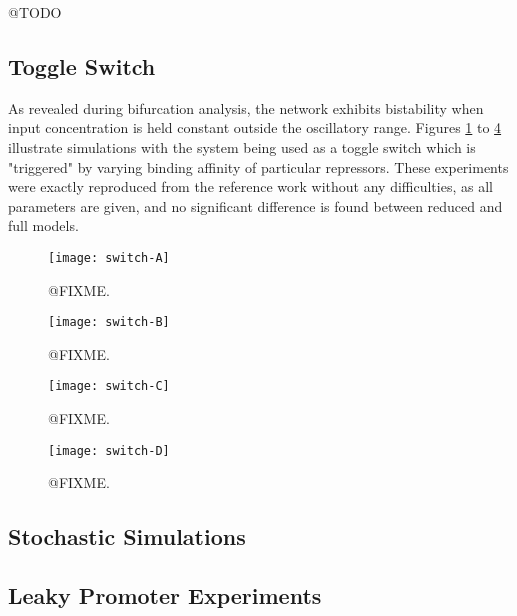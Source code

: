     @TODO


  \subsection{Toggle Switch}

    As revealed during bifurcation analysis, the network exhibits bistability when input concentration is held constant outside the oscillatory range.
    Figures \ref{fig.switch-A} to \ref{fig.switch-D} illustrate simulations with the system being used as a toggle switch which is "triggered" by varying binding affinity of particular repressors.
    These experiments were exactly reproduced from the reference work without any difficulties, as all parameters are given, and no significant difference is found between reduced and full models.

    \begin{figure}[!htbp]
      \centering
      \texttt{[image: switch-A]}
      \caption{@FIXME.}
      \label{fig.switch-A}
    \end{figure}

    \begin{figure}[!htbp]
      \centering
      \texttt{[image: switch-B]}
      \caption{@FIXME.}
      \label{fig.switch-B}
    \end{figure}

    \begin{figure}[!htbp]
      \centering
      \texttt{[image: switch-C]}
      \caption{@FIXME.}
      \label{fig.switch-C}
    \end{figure}

    \begin{figure}[!htbp]
      \centering
      \texttt{[image: switch-D]}
      \caption{@FIXME.}
      \label{fig.switch-D}
    \end{figure}


  \subsection{Stochastic Simulations}



  \subsection{Leaky Promoter Experiments}

